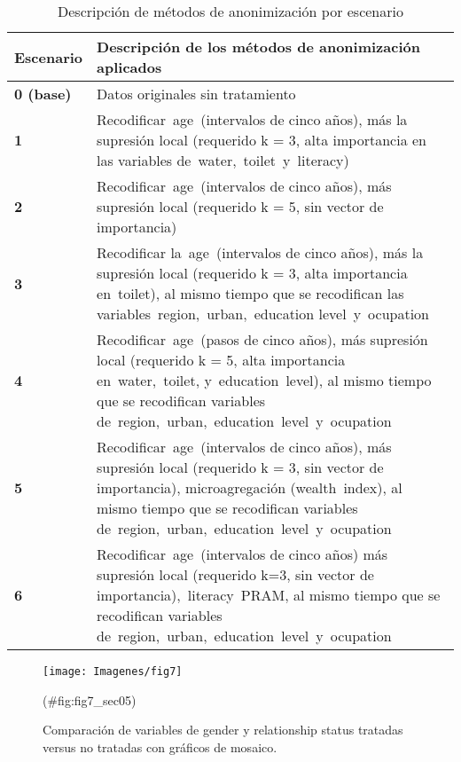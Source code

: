 \documentclass[
]{book}
\theoremstyle{definition}
\theoremstyle{definition}
\theoremstyle{definition}
\theoremstyle{definition}
\theoremstyle{remark}
\begin{document}
\begin{table}

\caption{\label{tab:tbl3lbn}Descripción de métodos de anonimización por escenario}
\begin{tabu} to 
\hline
Escenario & Descripción de los métodos de anonimización aplicados\\
\hline
\textbf{0 (base)} & Datos originales sin tratamiento\\
\hline
\textbf{1} & Recodificar age (intervalos de cinco años), más la supresión local (requerido k = 3, alta importancia en las variables de water, toilet y literacy)\\
\hline
\textbf{2} & Recodificar age (intervalos de cinco años), más supresión local (requerido k = 5, sin vector de importancia)\\
\hline
\textbf{3} & Recodificar la age (intervalos de cinco años), más la supresión local (requerido k = 3, alta importancia en toilet), al mismo tiempo que se recodifican las variables region, urban, education level y ocupation\\
\hline
\textbf{4} & Recodificar age (pasos de cinco años), más supresión local (requerido k = 5, alta importancia en water, toilet, y education level), al mismo tiempo que se recodifican variables de region, urban, education level y ocupation\\
\hline
\textbf{5} & Recodificar age (intervalos de cinco años), más supresión local (requerido k = 3, sin vector de importancia), microagregación (wealth index), al mismo tiempo que se recodifican variables de region, urban, education level y ocupation\\
\hline
\textbf{6} & Recodificar age (intervalos de cinco años) más supresión local (requerido k=3, sin vector de importancia), literacy PRAM, al mismo tiempo que se recodifican variables de region, urban, education level y ocupation\\
\hline
\end{tabu}
\end{table}

\begin{figure}

{\centering \texttt{[image: Imagenes/fig7]} 

}

\caption{Comparación de variables de gender y relationship status tratadas versus no tratadas con gráficos de mosaico.}(\#fig:fig7_sec05)
\end{figure}
\end{document}
